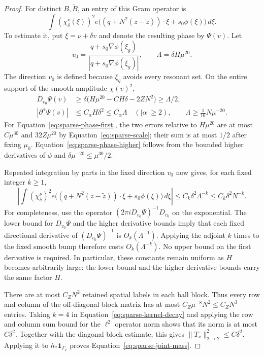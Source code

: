 \begin{proof}
For distinct $B,\widetilde B$, an entry of this Gram operator is
\[
 \int(\chi_\delta^\nu(\xi))^2
 e\big((q+N^2(z-\widetilde z))\cdot\xi+s_0\phi(\xi)\big)\,d\xi.
\]
To estimate it, put $\xi=\nu+\delta v$ and denote the resulting
phase by $\Psi(v)$.  Let
\[
 v_0=\frac{q+s_0\nabla\phi(\xi_g)}
              {|q+s_0\nabla\phi(\xi_g)|},\qquad
 \Lambda=\delta H\mu^{20}.
\]
The direction $v_0$ is defined because $\xi_g$ avoids every resonant
set.  On the entire support of the smooth amplitude $\chi(v)^2$,
\begin{align}
 D_{v_0}\Psi(v)
 &\geq \delta\big(H\mu^{20}-C H\delta-2ZN^2\big)
 \geq \Lambda/2,                                      \label{eq:sparse-phase-first}\\
 |\partial^\alpha\Psi(v)|
 &\leq C_\alpha H\delta^2\leq C_\alpha\Lambda
 \quad (|\alpha|\geq2),\qquad
 \Lambda\geq\tfrac1{16}N\mu^{-20}.                    \label{eq:sparse-phase-higher}
\end{align}
For Equation~\eqref{eq:sparse-phase-first}, the two errors relative
to $H\mu^{20}$ are at most $C\mu^{30}$ and $32Z\mu^{20}$ by
Equation~\eqref{eq:sparse-scale}; their sum is at most $1/2$ after
fixing $\mu_0$.  Equation~\eqref{eq:sparse-phase-higher} follows
from the bounded higher derivatives of $\phi$ and
$\delta\mu^{-20}\leq\mu^{30}/2$.

Repeated integration by parts in the fixed direction $v_0$ now gives,
for each fixed integer $k\geq1$,
\begin{equation}\label{eq:sparse-kernel-decay}
 \left|\int(\chi_\delta^\nu)^2
   e\big((q+N^2(z-\widetilde z))\cdot\xi+s_0\phi(\xi)\big)
       \,d\xi\right|
 \leq C_k\delta^2\Lambda^{-k}
 \leq C_k\delta^2N^{-k}.
\end{equation}
For completeness, use the operator
$(2\pi iD_{v_0}\Psi)^{-1}D_{v_0}$ on the exponential.  The lower
bound for $D_{v_0}\Psi$ and the higher derivative bounds imply that
each fixed directional derivative of $(D_{v_0}\Psi)^{-1}$ is
$O_k(\Lambda^{-1})$.  Applying the adjoint $k$ times to the fixed
smooth bump therefore costs $O_k(\Lambda^{-k})$.  No upper bound on
the first derivative is required.  In particular, these constants
remain uniform as $H$ becomes arbitrarily large: the lower bound and
the higher derivative bounds carry the same factor $H$.

There are at most $C_ZN^2$ retained spatial labels in each ball block.
Thus every row and column of the off-diagonal block matrix has at
most $C_Z\mu^{-8}N^2\leq C_ZN^3$ entries.  Taking $k=4$ in
Equation~\eqref{eq:sparse-kernel-decay} and applying the row and
column sum bound for the $\ell^2$ operator norm shows that its norm
is at most $C\delta^2$.  Together with the diagonal block estimate,
this gives $\|T_\nu\|_{2\to2}^2\leq C\delta^2$.  Applying it to
$h_*\mathbf1_{\Gamma_\nu}$ proves
Equation~\eqref{eq:sparse-joint-mass}.


\end{proof}

